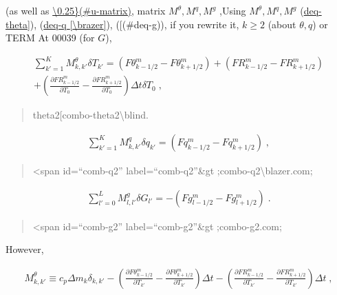 (as well as
\protect\hyperlink{u-matrix}{\textbackslash0.25\}(\#u-matrix)}, matrix
\(M^{\theta}, M^q, M^g\) ,Using \(M^{\theta}, M^q, M^g\)
(\protect\hyperlink{deq-theta}{deq-theta{]}}),
(\protect\hyperlink{deq-q}{deq-q {[}\textbackslash brazer{]}}),
({[}\brazer[deq-g\end{eqnarray}](\#deq-g)), if you rewrite it, \(k \ge 2\) (about
\(\theta, q\)) or TERM At 00039 (for \(G\)),

\begin{eqnarray}
    \sum_{k'=1}^{K}  M^\theta_{k,k'} \delta T_{k'}
        =  (F\theta^{m}_{k-1/2} - F\theta^{m}_{k+1/2})
        + (FR^{m}_{k-1/2} - FR^{m}_{k+1/2})   \\
 +  \left(\frac{\partial FR^{m}_{k-1/2}}{\partial T_0} - \frac{\partial FR^{m}_{k+1/2}}{\partial T_0} \right)
     \Delta t\delta T_0 \; ,
\end{eqnarray}

\begin{quote}
theta2{[}combo-theta2\textbackslash blind\blind\blind\blind\blind\blind\blind\blind\blind\blind\blind\blind\blind\blind\blind\blind\blind\blind\blind\blind\blind\blind\blind\blind\blind\blind\blind\blind\blind\blind\blind\blind\blind\blind\blind\blind\blind\blind\blind\blind\blind\blind\blind\blind\blind\blind\blind\blind\blind\blind\blind\blind\blind\blind\blind\blind\blind\blind\blind\bladz.
\end{quote}

\begin{eqnarray}
 \sum_{k'=1}^{K}  M^q_{k,k'} \delta q_{k'}
         = (Fq^{m}_{k-1/2} - Fq^{m}_{k+1/2}) \; ,
\end{eqnarray}

\begin{quote}
\textless span id=``comb-q2'' label=``comb-q2''\&gt
;combo-q2\textbackslash blazer.com;
\end{quote}

\begin{eqnarray}
  \sum_{l'=0}^{L} M^g_{l,l'} \delta G_{l'}
         = - (Fg^{m}_{l-1/2} - Fg^{m}_{l+1/2}) \; .
\end{eqnarray}

\begin{quote}
\textless span id=``comb-g2'' label=``comb-g2''\&gt
;combo-g2\blazer.com;
\end{quote}

However,

\begin{eqnarray}
M^{\theta}_{k,k'} \equiv c_p \Delta m_k \delta_{k,k'}
          -  \left(  \frac{\partial F\theta^{m}_{k-1/2}}{\partial T_{k'}}
                   - \frac{\partial F\theta^{m}_{k+1/2}}{\partial T_{k'}} \right) \Delta t
          -  \left(  \frac{\partial FR^{m}_{k-1/2}}{\partial T_{k'}}
                   - \frac{\partial FR^{m}_{k+1/2}}{\partial T_{k'}} \right) \Delta t \; ,
\end{eqnarray}


